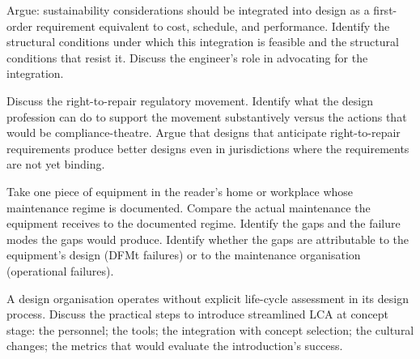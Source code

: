 \begin{exercise}
Argue: sustainability considerations should be integrated into design as a first-order requirement equivalent to cost, schedule, and performance. Identify the structural conditions under which this integration is feasible and the structural conditions that resist it. Discuss the engineer's role in advocating for the integration.
\end{exercise}

\begin{exercise}
Discuss the right-to-repair regulatory movement. Identify what the design profession can do to support the movement substantively versus the actions that would be compliance-theatre. Argue that designs that anticipate right-to-repair requirements produce better designs even in jurisdictions where the requirements are not yet binding.
\end{exercise}

\begin{exercise}
Take one piece of equipment in the reader's home or workplace whose maintenance regime is documented. Compare the actual maintenance the equipment receives to the documented regime. Identify the gaps and the failure modes the gaps would produce. Identify whether the gaps are attributable to the equipment's design (DFMt failures) or to the maintenance organisation (operational failures).
\end{exercise}

\begin{exercise}
A design organisation operates without explicit life-cycle assessment in its design process. Discuss the practical steps to introduce streamlined LCA at concept stage: the personnel; the tools; the integration with concept selection; the cultural changes; the metrics that would evaluate the introduction's success.
\end{exercise}
